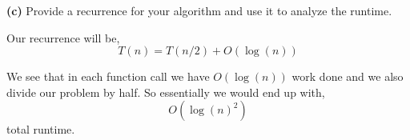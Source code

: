 \documentclass[12pt]{article}
\newcommand{\question}[3][Q]{
\begin{description}
\item \textbf{#1{#2}} #3
\end{description}
}
\begin{document}
\question[]{(c)}{
    Provide a recurrence for your algorithm and use it to analyze the runtime.
}
\begin{answer}
    Our recurrence will be, 
    $$ T(n) = T(n /2) + O(\log(n)) $$ 

    We see that in each function call we have $O(\log(n))$ work done and we also divide our problem by half. So essentially we would end up with, 
    $$ O(\log(n)^2) $$ total runtime.
\end{answer}
\end{document}
